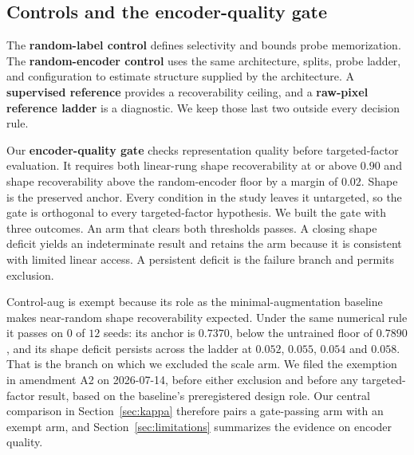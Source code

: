 \documentclass[10pt]{article}
\begin{document}
\subsection{Controls and the encoder-quality gate}
\label{sec:controls}
The \textbf{random-label control} defines selectivity and bounds probe memorization. The
\textbf{random-encoder control} uses the same architecture, splits, probe ladder, and configuration
to estimate structure supplied by the architecture. A \textbf{supervised reference} provides a
recoverability ceiling, and a \textbf{raw-pixel reference ladder} is a diagnostic. We keep
those last two outside every decision rule.

Our \textbf{encoder-quality gate} checks representation quality before targeted-factor evaluation.
It requires both linear-rung shape recoverability at or above $0.90$ and shape
recoverability above the random-encoder floor by a margin of $0.02$. Shape is the preserved anchor. Every condition in the study leaves it untargeted, so the gate is
orthogonal to every targeted-factor hypothesis. We built the gate with three outcomes. An arm that
clears both thresholds passes. A closing shape deficit yields an indeterminate result and retains
the arm because it is consistent with limited linear access. A persistent deficit is the failure
branch and permits exclusion.

Control-aug is exempt because its role as the minimal-augmentation baseline makes
near-random shape recoverability expected. Under the same numerical rule it passes on $0$ of $12$
seeds: its anchor is $0.7370$, below the untrained floor of $0.7890$, and its shape deficit persists
across the ladder at
$0.052$, $0.055$, $0.054$ and $0.058$. That is the branch on which we excluded the scale arm. We
filed the exemption in amendment A2 on 2026-07-14, before either exclusion and before any
targeted-factor result, based on the baseline's preregistered design role. Our central comparison in
Section~\ref{sec:kappa} therefore pairs a gate-passing arm with an exempt arm, and
Section~\ref{sec:limitations} summarizes the evidence on encoder quality.
\end{document}
